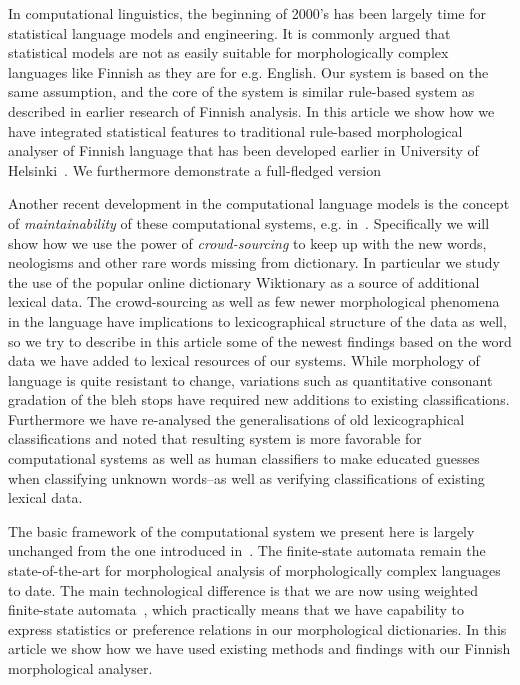 \documentclass[a4paper,12pt]{article}
\begin{document}
In computational linguistics, the beginning of 2000's has been
largely time for statistical language models and engineering. It is commonly
argued that statistical models are not as easily suitable for morphologically
complex languages like Finnish as they are for e.g. English. Our system is
based on the same assumption, and the core of the system is similar rule-based
system as described in earlier research of Finnish analysis. In this article
we show how we have integrated statistical features to traditional rule-based
morphological analyser of Finnish language that has been developed
earlier in University of Helsinki~\cite{pirinen2008}. We furthermore demonstrate
a full-fledged version

Another recent development in the computational language models is the concept
of \emph{maintainability} of these computational systems, e.g.
in~\cite{maxwell}. Specifically we will show how we use the power of
\emph{crowd-sourcing} to keep up with the new words, neologisms and other rare
words missing from dictionary. In particular we study the use of the popular
online dictionary Wiktionary as a source of additional lexical data. The
crowd-sourcing as well as few newer morphological phenomena in the language
have implications to lexicographical structure of the data as well, so we try
to describe in this article some of the newest findings based on the word data
we have added to lexical resources of our systems. While morphology of language
is quite resistant to change, variations such as quantitative consonant
gradation of the bleh stops have required new additions to existing
classifications. Furthermore we have re-analysed the generalisations of old
lexicographical classifications and noted that resulting system is more
favorable for computational systems as well as human classifiers to make
educated guesses when classifying unknown words–as well as verifying
classifications of existing lexical data.

The basic framework of the computational system we present here is largely
unchanged from the one introduced in~\cite{koskenniemi1983twolevel}. 
The finite-state automata remain the state-of-the-art for morphological analysis
of morphologically complex languages to date. The main
technological difference is that we are now using weighted finite-state 
automata~\cite{openfst}, which practically means that we have capability to
express statistics or preference relations in our morphological dictionaries.
In this article we show how we have used existing methods and findings with
our Finnish morphological analyser.
\end{document}
